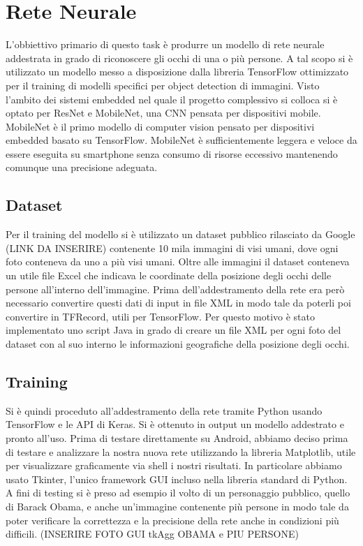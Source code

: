 \documentclass[11pt]{article}
\begin{document}
\section{Rete Neurale}
L’obbiettivo primario di questo task è produrre un modello di rete neurale addestrata in grado di
riconoscere gli occhi di una o più persone. A tal scopo si è utilizzato un modello messo a disposizione dalla libreria
TensorFlow ottimizzato per il training di modelli specifici per object detection di immagini. Visto
l’ambito dei sistemi embedded nel quale il progetto complessivo si colloca si è optato per ResNet e MobileNet,
una CNN pensata per dispositivi mobile. MobileNet è il primo modello di computer vision pensato
per dispositivi embedded basato su TensorFlow. MobileNet è sufficientemente leggera e veloce da
essere eseguita su smartphone senza consumo di risorse eccessivo mantenendo comunque una
precisione adeguata.


\subsection{Dataset}
Per il training del modello si è utilizzato un dataset pubblico rilasciato da Google (LINK DA INSERIRE) contenente 10 mila immagini di visi umani, dove ogni foto conteneva da uno a più visi umani.
\newline
Oltre alle immagini il dataset conteneva un utile file Excel che indicava le coordinate della posizione degli occhi delle persone all'interno dell'immagine.
\newline \newline
Prima dell'addestramento della rete era però necessario convertire questi dati di input in file XML in modo tale da poterli poi convertire in TFRecord, utili per TensorFlow. Per questo motivo è stato implementato uno script Java in grado di creare un file XML per ogni foto del dataset con al suo interno le informazioni geografiche della posizione degli occhi. 


\subsection{Training}
Si è quindi proceduto all’addestramento della rete
tramite Python usando TensorFlow e le API di Keras. Si è ottenuto in output un modello addestrato
e pronto all’uso. 
\newline \newline
Prima di testare direttamente su Android, abbiamo deciso prima di testare e analizzare la nostra nuova rete utilizzando la libreria Matplotlib, utile per visualizzare graficamente via shell i nostri risultati. In particolare abbiamo usato Tkinter, l'unico framework GUI incluso nella libreria standard di Python.
\newline
A fini di testing si è preso ad esempio il volto di un
personaggio pubblico, quello di Barack Obama, e anche un'immagine contenente più persone in modo tale da poter verificare la correttezza e la precisione della rete anche in condizioni più difficili. (INSERIRE FOTO GUI tkAgg OBAMA e PIU PERSONE)
\end{document}
